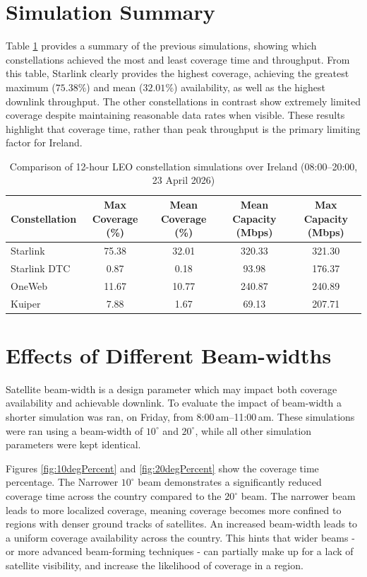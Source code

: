 \section{Simulation Summary}
Table \ref{tab:leo_comparison} provides a summary of the previous simulations, showing which constellations achieved the most and least coverage time and throughput. 
From this table, Starlink clearly provides the highest coverage, achieving the greatest maximum ($75.38\%$) and mean ($32.01\%$) availability, as well as the highest downlink throughput. The other constellations in contrast show extremely limited coverage despite maintaining reasonable data rates when visible. These results highlight that coverage time, rather than peak throughput is the primary limiting factor for Ireland. 
\begin{table}[h]
\centering
\caption{Comparison of 12-hour LEO constellation simulations over Ireland (08:00--20:00, 23 April 2026)}
\begin{tabular}{|l|c|c|c|c|}
\hline
\textbf{Constellation} & \textbf{Max Coverage (\%)} & \textbf{Mean Coverage (\%)} & \textbf{Mean Capacity (Mbps)} & \textbf{Max Capacity (Mbps)} \\
\hline
Starlink & 75.38 & 32.01 & 320.33 & 321.30 \\
\hline
Starlink DTC & 0.87 & 0.18 & 93.98 & 176.37 \\
\hline
OneWeb & 11.67 & 10.77 & 240.87 & 240.89 \\
\hline
Kuiper & 7.88 & 1.67 & 69.13 & 207.71 \\
\hline
\end{tabular}
\label{tab:leo_comparison}
\end{table}



\FloatBarrier
\section{Effects of Different Beam-widths}
Satellite beam-width is a design parameter which may impact both coverage availability and achievable downlink. To evaluate the impact of beam-width a shorter simulation was ran, on Friday,  from 8:00\,am--11:00\,am. These simulations were ran using a beam-width of $10^{\circ}$ and $20^{\circ}$, while all other simulation parameters were kept identical.


Figures \ref{fig:10degPercent} and \ref{fig:20degPercent} show the coverage time percentage. The Narrower $10^{\circ}$ beam demonstrates
a significantly reduced coverage time across the country compared to the $20^{\circ}$ beam. The narrower beam leads to more localized coverage, meaning coverage becomes more confined to regions with denser ground tracks of satellites. An increased beam-width leads to a uniform coverage availability across the country. This hints that wider beams -or more advanced beam-forming techniques - can partially make up for a lack of satellite visibility, and increase the likelihood of coverage in a region.  

